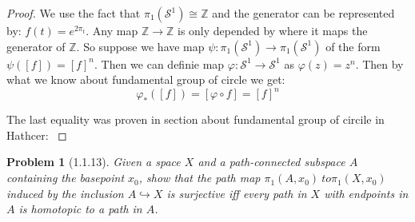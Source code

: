 \documentclass[11pt, a4paper, final]{amsart}
\newcommand{\Z}{{\mathbb{Z}}}
\newcommand{\sphere}{\mathcal{S}}
\numberwithin{theorem}{section}
\newtheorem{problem}[theorem]{Problem}
\theoremstyle{definition}
\theoremstyle{remark}
\begin{document}
\begin{proof}
    We use the fact that $\pi_1(\sphere^1) \cong \Z$ and the generator can be represented by:
    $f(t) = e^{2\pi_t}$. Any map $\Z \to \Z$ is only depended by where it maps the generator of $\Z$.
    So suppose we have map $\psi : \pi_1(\sphere^1) \to \pi_1(\sphere^1)$ of the form $\psi([f])= [f]^n$.
    Then we can definie map $\varphi : \sphere^1 \to \sphere^1$ as $\varphi(z) = z^n$. Then by what we know about
    fundamental group of circle we get:
    $$\varphi_{*}([f]) =  [\varphi \circ f] = [f]^n$$

    The last equality was proven in section about fundamental group of circile in Hathcer: \cite{AH}
\end{proof}

\begin{problem}[1.1.13]\label{problem: 1.1.13}
    Given a space $X$ and a path-connected subspace $A$ containing the basepoint $x_0$, show that the path map
    $\pi_1(A, x_0) \ to \pi_1(X, x_0)$ induced by the inclusion $A \hookrightarrow X$ is surjective iff every 
    path in $X$ with endpoints in $A$ is homotopic to a path in $A$.
\end{problem}
\end{document}
